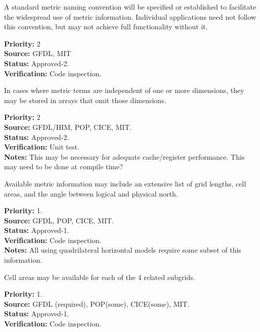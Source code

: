A standard metric naming convention will be specified or established to facilitate
the widespread use of metric information.  Individual applications need not
follow this convention, but may not achieve full functionality without it.
\begin{reqlist}
{\bf Priority:} 2 \\
{\bf Source:} GFDL, MIT \\
{\bf Status:} Approved-2. \\
{\bf Verification:} Code inspection.
\end{reqlist}

In cases where metric terms are independent of one or more dimensions, they may be
stored in arrays that omit those dimensions.
\begin{reqlist}
{\bf Priority:} 2 \\
{\bf Source:} GFDL/HIM, POP, CICE, MIT. \\
{\bf Status:} Approved-2. \\
{\bf Verification:} Unit test. \\
{\bf Notes:} This may be necessary for adequate cache/register performance.  This may
need to be done at compile time?
\end{reqlist}

Available metric information may include an extensive list of grid lengths, cell
areas, and the angle between logical and physical north.
\begin{reqlist}
{\bf Priority:} 1. \\
{\bf Source:} GFDL, POP, CICE, MIT. \\
{\bf Status:} Approved-1. \\
{\bf Verification:} Code inspection. \\
{\bf Notes:} All using quadrilateral horizontal models require some subset of this information.
\end{reqlist}

Cell areas may be available for each of the 4 related subgrids.
\begin{reqlist}
{\bf Priority:} 1. \\
{\bf Source:} GFDL (required), POP(some), CICE(some), MIT. \\
{\bf Status:} Approved-1. \\
{\bf Verification:} Code inspection.
\end{reqlist}

